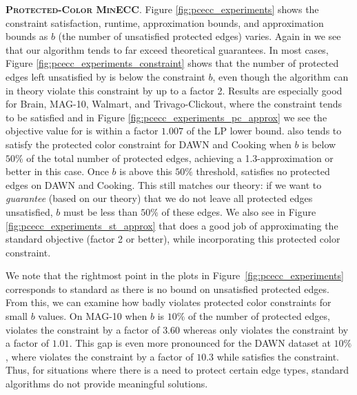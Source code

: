 \textbf{\textsc{Protected-Color MinECC}}.
Figure \ref{fig:pcecc_experiments} shows the constraint satisfaction, runtime, \algpc{} approximation bounds, and \algecc{} approximation bounds as $b$ (the number of unsatisfied protected edges) varies. Again in we see that our algorithm tends to far exceed theoretical guarantees.
In most cases, Figure \ref{fig:pcecc_experiments_constraint} shows that the number of protected edges left unsatisfied by \algpc{} is below the constraint $b$, even though the algorithm can in theory violate this constraint by up to a factor 2. Results are especially good for Brain, MAG-10, Walmart, and Trivago-Clickout, where the constraint tends to be satisfied and in Figure \ref{fig:pcecc_experiments_pc_approx} we see the objective value for \algcf{} is within a factor $1.007$ of the LP lower bound.
\algpc{} also tends to satisfy the protected color constraint for DAWN and Cooking when $b$ is below $50\%$ of the total number of protected edges, achieving a 1.3-approximation or better in this case. Once $b$ is above this $50\%$ threshold, \algpc{} satisfies no protected edges on DAWN and Cooking. This still matches our theory: if we want to \emph{guarantee} (based on our theory) that we do not leave all protected edges unsatisfied, $b$ must be less than $50\%$ of these edges. We also see in Figure \ref{fig:pcecc_experiments_st_approx} that \algpc{} does a good job of approximating the standard \minecc{} objective (factor 2 or better), while incorporating this protected color constraint.

We note that the rightmost point in the plots in Figure~\ref{fig:pcecc_experiments} corresponds to standard \minecc{} as there is no bound on unsatisfied protected edges. From this, we can examine how badly \algecc{} violates protected color constraints for small $b$ values. On MAG-10 when $b$ is $10\%$ of the number of protected edges, \algecc{} violates the constraint by a factor of $3.60$ whereas \algpc{} only violates the constraint by a factor of $1.01$. This gap is even more pronounced for the DAWN dataset at $10\%$, where \algecc{} violates the constraint by a factor of $10.3$ while \algpc{} satisfies the constraint. Thus, for situations where there is a need to protect certain edge types, standard \minecc{} algorithms do not provide meaningful solutions.

